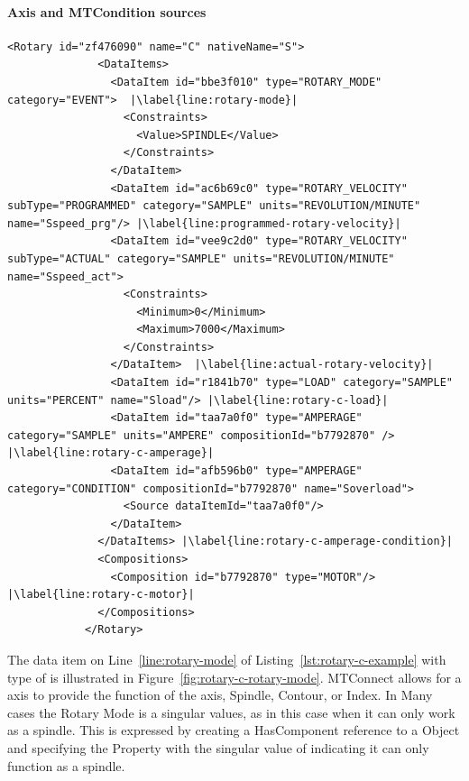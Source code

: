 \FloatBarrier

\paragraph{ Axis and \gls{MTCondition} sources}

\begin{lstlisting}[firstnumber=last,%
    caption={Rotary C Axis},label={lst:rotary-c-example},escapechar=|]
            <Rotary id="zf476090" name="C" nativeName="S">
              <DataItems>
                <DataItem id="bbe3f010" type="ROTARY_MODE" category="EVENT">  |\label{line:rotary-mode}|
                  <Constraints>
                    <Value>SPINDLE</Value>
                  </Constraints>
                </DataItem>
                <DataItem id="ac6b69c0" type="ROTARY_VELOCITY" subType="PROGRAMMED" category="SAMPLE" units="REVOLUTION/MINUTE" name="Sspeed_prg"/> |\label{line:programmed-rotary-velocity}|
                <DataItem id="vee9c2d0" type="ROTARY_VELOCITY" subType="ACTUAL" category="SAMPLE" units="REVOLUTION/MINUTE" name="Sspeed_act"> 
                  <Constraints>
                    <Minimum>0</Minimum>
                    <Maximum>7000</Maximum>
                  </Constraints>
                </DataItem>  |\label{line:actual-rotary-velocity}|
                <DataItem id="r1841b70" type="LOAD" category="SAMPLE" units="PERCENT" name="Sload"/> |\label{line:rotary-c-load}|
                <DataItem id="taa7a0f0" type="AMPERAGE" category="SAMPLE" units="AMPERE" compositionId="b7792870" /> |\label{line:rotary-c-amperage}|
                <DataItem id="afb596b0" type="AMPERAGE" category="CONDITION" compositionId="b7792870" name="Soverload">
                  <Source dataItemId="taa7a0f0"/>
                </DataItem>
              </DataItems> |\label{line:rotary-c-amperage-condition}|
              <Compositions>
                <Composition id="b7792870" type="MOTOR"/> |\label{line:rotary-c-motor}|
              </Compositions>
            </Rotary>
\end{lstlisting}

The data item on Line~\ref{line:rotary-mode} of Listing~\ref{lst:rotary-c-example} with \gls{type} of  is illustrated in Figure~\ref{fig:rotary-c-rotary-mode}. MTConnect allows for a  axis to provide the function of the axis, Spindle, Contour, or Index. In Many cases the Rotary Mode is a singular values, as in this case when it can only work as a spindle. This is expressed by creating a \gls{HasComponent} reference to a  \gls{Object} and specifying the  \gls{Property}  with the singular value of\xml{["SPINDLE"]} indicating it can only function as a spindle. 

